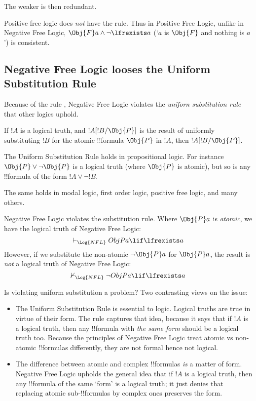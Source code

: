 \documentclass[../../../include/open-logic-section]{subfiles}
\begin{document}
The weaker \Intro{\eq}  is then redundant. 

Positive free logic does \emph{not} have the  rule. Thus 
in Positive Free Logic, unlike in Negative Free Logic, 
$\Obj{F}a\land\lnot\lfrexists a$ (`$a$ is $\Obj{F}$ and nothing is $a$')
is consistent. 

\subsection{Negative Free Logic looses the Uniform Substitution Rule}


Because of the rule , Negative Free Logic violates the 
\emph{uniforn substitution rule} that other logics uphold. 

\begin{defn}
    If $!A$ is a logical truth, and $!A[!B/\Obj{P}]$ is the 
    result of uniformly substituting $!B$ for 
    the atomic !!{formula} $\Obj{P}$ in $!A$, then 
    $!A[!B/\Obj{P}]$.
\end{defn}

\begin{ex}
The Uniform Substitution Rule holds in propositional logic. For instance
$\Obj{P}\lor\lnot\Obj{P}$ is a logical truth (where $\Obj{P}$ is 
atomic), but so is any !!{formula} of the form $!A\lor\lnot!B$.
\end{ex}

The same holds in modal logic, first order logic, positive free logic, 
and many others.

Negative Free Logic violates the substitution rule. Where $\Obj{P}a$
is \emph{atomic}, we have the logical truth of Negative Free Logic:
$$\vdash_{\Log{NFL}}Obj{P}a\lif \lfrexists a$$
However, if we substitute the non-atomic $\lnot\Obj{P}a$ for $\Obj{P}a$,
the result is \emph{not} a logical truth of Negative Free Logic:
$$\nvdash_{\Log{NFL}}\lnot Obj{P}a\lif \lfrexists a$$

Is violating uniform substitution a problem? Two contrasting views on the issue:
\begin{itemize}
    \item The Uniform Substitution Rule is essential to logic. Logical truths are 
    true in virtue of their form. The rule captures that idea, because it 
    says that if $!A$ is a logical truth, then any !!{formula} with \emph{the 
    same form} should be a logical truth too. Because the principles
    of Negative Free Logic treat atomic vs non-atomic !!{formula}s differently, 
    they are not formal hence not logical.
    \item The difference between atomic and complex !!{formula}s \emph{is}
    a matter of form. Negative Free Logic upholds the general idea that 
    if $!A$ is a logical truth, then any !!{formula} of the same `form'
    is a logical truth; it just denies that replacing atomic sub-!!{formula}s
    by complex ones preserves the form. 
\end{itemize}
\end{document}
